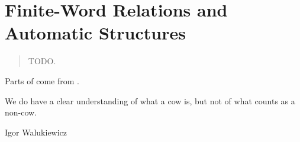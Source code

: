 \chapter{Finite-Word Relations and Automatic Structures}
\label{ch:preliminaries-automatic-structures}

\begin{chapterpresentation}
	\begin{abstract}
		TODO.
	\end{abstract}
	\medskip
	\begin{acknowledgements}
		Parts of 
		come from \cite[\S~1]{Morvan2024Algebras}.
	\end{acknowledgements}
\end{chapterpresentation}
	
\chaptertoc

\epigraph{We do have a clear understanding of what a cow is, but not of what counts as a non-cow.}{Igor Walukiewicz}



